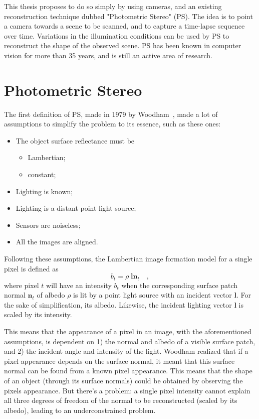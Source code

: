 \documentclass{report}
\begin{document}
This thesis proposes to do so simply by using cameras, and an existing reconstruction technique dubbed "Photometric Stereo" (PS). The idea is to point a camera towards a scene to be scanned, and to capture a time-lapse sequence over time. Variations in the illumination conditions can be used by PS to reconstruct the shape of the observed scene. PS has been known in computer vision for more than 35 years, and is still an active area of research.

\section{Photometric Stereo}
\label{sec:ps_ori}

The first definition of PS, made in 1979 by Woodham~\cite{Woodham1979}, made a lot of assumptions to simplify the problem to its essence, such as these ones:

\begin{itemize} \setlength\itemsep{-0.2em}
  \item The object surface reflectance must be
  \vspace{-0.65em}\begin{itemize} \setlength\itemsep{0.1em}
    \item Lambertian;
    \item constant;
  \end{itemize} \vspace{-0.4em}
  \item Lighting is known;
  \item Lighting is a distant point light source;
  \item Sensors are noiseless;
  \item All the images are aligned.
\end{itemize}

Following these assumptions, the Lambertian image formation model for a single pixel is defined as
\begin{equation}
b_t =  \rho \; \mathbf{l} \mathbf{n}_t \quad,
\end{equation}
where pixel $t$ will have an intensity $b_t$ when the corresponding surface patch normal $\mathbf{n}_t$ of albedo $\rho$ is lit by a point light source with an incident vector $\mathbf{l}$. For the sake of simplification, its albedo. Likewise, the incident lighting vector $\mathbf{l}$ is scaled by its intensity.

This means that the appearance of a pixel in an image, with the aforementioned assumptions, is dependent on 1) the normal and albedo of a visible surface patch, and 2) the incident angle and intensity of the light. Woodham realized that if a pixel appearance depends on the surface normal, it meant that this surface normal can be found from a known pixel appearance. This means that the shape of an object (through its surface normals) could be obtained by observing the pixels appearance. But there's a problem: a single pixel intensity cannot explain all three degrees of freedom of the normal to be reconstructed (scaled by its albedo), leading to an underconstrained problem.
\end{document}

